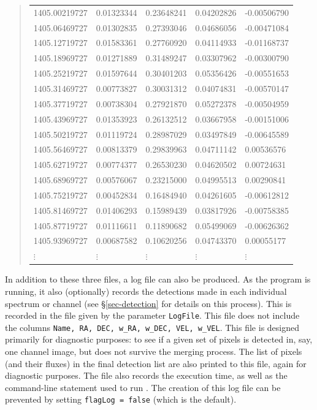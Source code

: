 \begin{quote}
  {\footnotesize
    \begin{tabular}{lllll}
      1405.00219727  &0.01323344  &0.23648241  &0.04202826  &-0.00506790  \\
      1405.06469727  &0.01302835  &0.27393046  &0.04686056  &-0.00471084  \\
      1405.12719727  &0.01583361  &0.27760920  &0.04114933  &-0.01168737  \\
      1405.18969727  &0.01271889  &0.31489247  &0.03307962  &-0.00300790  \\
      1405.25219727  &0.01597644  &0.30401203  &0.05356426  &-0.00551653  \\
      1405.31469727  &0.00773827  &0.30031312  &0.04074831  &-0.00570147  \\
      1405.37719727  &0.00738304  &0.27921870  &0.05272378  &-0.00504959  \\
      1405.43969727  &0.01353923  &0.26132512  &0.03667958  &-0.00151006  \\  
      1405.50219727  &0.01119724  &0.28987029  &0.03497849  &-0.00645589  \\  
      1405.56469727  &0.00813379  &0.29839963  &0.04711142  &0.00536576   \\  
      1405.62719727  &0.00774377  &0.26530230  &0.04620502  &0.00724631   \\  
      1405.68969727  &0.00576067  &0.23215000  &0.04995513  &0.00290841   \\ 
      1405.75219727  &0.00452834  &0.16484940  &0.04261605  &-0.00612812  \\  
      1405.81469727  &0.01406293  &0.15989439  &0.03817926  &-0.00758385  \\ 
      1405.87719727  &0.01116611  &0.11890682  &0.05499069  &-0.00626362  \\  
      1405.93969727  &0.00687582  &0.10620256  &0.04743370  &0.00055177   \\
      $\vdots$       &$\vdots$    &$\vdots$    &$\vdots$    &$\vdots$     \\
    \end{tabular}
  }
\end{quote}

In addition to these three files, a log file can also be produced. As
the program is running, it also (optionally) records the detections
made in each individual spectrum or channel (see \S\ref{sec-detection}
for details on this process). This is recorded in the file given by
the parameter \texttt{LogFile}. This file does not include the columns
\texttt{Name, RA, DEC, w\_RA, w\_DEC, VEL, w\_VEL}. This file is
designed primarily for diagnostic purposes: \eg to see if a given set
of pixels is detected in, say, one channel image, but does not survive
the merging process. The list of pixels (and their fluxes) in the
final detection list are also printed to this file, again for
diagnostic purposes. The file also records the execution time, as well
as the command-line statement used to run \duchamp. The creation of
this log file can be prevented by setting \texttt{flagLog = false}
(which is the default).

